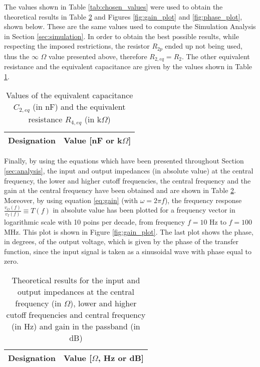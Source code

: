 The values shown in Table \ref{tab:chosen_values} were used to obtain the theoretical results in Table \ref{tab:final_values} and Figures \ref{fig:gain_plot} and \ref{fig:phase_plot}, shown below. These are the same values used to compute the Simulation Analysis in Section \ref{sec:simulation}. In order to obtain the best possible results, while respecting the imposed restrictions, the resistor $R_{2p}$ ended up not being used, thus the $\infty$ $\Omega$ value presented above, therefore $R_{2,eq}=R_2$. The other equivalent resistance and the equivalent capacitance are given by the values shown in Table \ref{tab:chosen_equiv_values}.

\begin{table}[H]
  \centering
  \begin{tabular}{|c|c|}
    \hline    
        {\bf Designation} & {\bf Value [nF or k$\Omega$]} \\ \hline
        
  \end{tabular}
  \caption{Values of the equivalent capacitance $C_{2,eq}$ (in nF) and the equivalent resistance $R_{4,eq}$ (in k$\Omega$)}
  \label{tab:chosen_equiv_values}
\end{table}

Finally, by using the equations which have been presented throughout Section \ref{sec:analysis}, the input and output impedances (in absolute value) at the central frequency, the lower and higher cutoff frequencies, the central frequency and the gain at the central frequency have been obtained and are shown in Table \ref{tab:final_values}. Moreover, by using equation \ref{eq:gain} (with $\omega=2\pi f$), the frequency response $\frac{v_O(f)}{v_I(f)}\equiv T(f)$ in absolute value has been plotted for a frequency vector in logarithmic scale with 10 poins per decade, from frequency $f=10$ Hz to $f=100$ MHz. This plot is shown in Figure \ref{fig:gain_plot}. The last plot shows the phase, in degrees, of the output voltage, which is given by the phase of the transfer function, since the input signal is taken as a sinusoidal wave with phase equal to zero.

\begin{table}[H]
  \centering
  \begin{tabular}{|c|c|}
    \hline    
        {\bf Designation} & {\bf Value [$\Omega$, Hz or dB]} \\ \hline
        
  \end{tabular}
  \caption{Theoretical results for the input and output impedances at the central frequency (in $\Omega$), lower and higher cutoff frequencies and central frequency (in Hz) and gain in the passband (in dB)}
  \label{tab:final_values}
\end{table}


